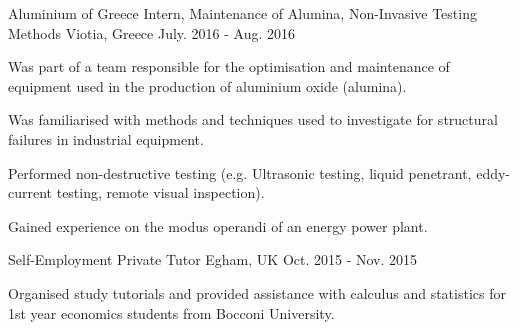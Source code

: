\begin{cventries}
  \cventry
    {Aluminium of Greece}
    {Intern, Maintenance of Alumina, Non-Invasive Testing Methods}    
    {Viotia, Greece}
    {July. 2016 - Aug. 2016}
    {
      \begin{cvitems}
       \item {Was part of a team responsible for the optimisation and maintenance of equipment used in the production of aluminium oxide (alumina).}
       \item {Was familiarised with methods and techniques used to investigate for structural failures in industrial equipment.}
       \item {Performed non-destructive testing (e.g. Ultrasonic testing, liquid penetrant, eddy-current testing, remote visual inspection).}
       \item {Gained experience on the modus operandi of an energy power plant.}
      \end{cvitems}
    }
  	
  \cventry
  	{Self-Employment}
		{Private Tutor}
		{Egham, UK}
		{Oct. 2015 - Nov. 2015}
		{
	 	  \begin{cvitems}
	  		\item {Organised study tutorials and provided assistance with calculus and statistics for 1st year economics students from Bocconi University.}
		  \end{cvitems}
		}
		

\end{cventries}
